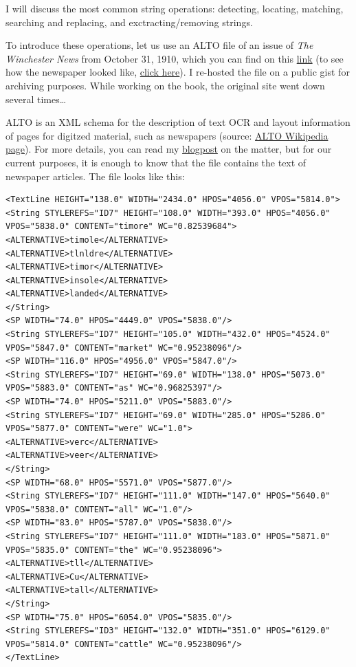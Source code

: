 \documentclass[
]{article}
\begin{document}
I will discuss the most common string operations: detecting, locating, matching, searching and
replacing, and exctracting/removing strings.

To introduce these operations, let us use an ALTO file of an issue of \emph{The Winchester News} from
October 31, 1910, which you can find on this
\href{https://gist.githubusercontent.com/b-rodrigues/5139560e7d0f2ecebe5da1df3629e015/raw/e3031d894ffb97217ddbad1ade1b307c9937d2c8/gistfile1.txt}{link} (to see
how the newspaper looked like,
\href{https://chroniclingamerica.loc.gov/lccn/sn86069133/1910-10-31/ed-1/seq-1/}{click here}). I re-hosted
the file on a public gist for archiving purposes. While working on the book, the original site went
down several times\ldots{}

ALTO is an XML schema for the description of text OCR and layout information of pages for digitzed
material, such as newspapers (source: \href{https://en.wikipedia.org/wiki/ALTO_(XML)}{ALTO Wikipedia page}).
For more details, you can read my
\href{https://www.brodrigues.co/blog/2019-01-13-newspapers_mets_alto/}{blogpost}
on the matter, but for our current purposes, it is enough to know that the file contains the text
of newspaper articles. The file looks like this:

\begin{verbatim}
<TextLine HEIGHT="138.0" WIDTH="2434.0" HPOS="4056.0" VPOS="5814.0">
<String STYLEREFS="ID7" HEIGHT="108.0" WIDTH="393.0" HPOS="4056.0" VPOS="5838.0" CONTENT="timore" WC="0.82539684">
<ALTERNATIVE>timole</ALTERNATIVE>
<ALTERNATIVE>tlnldre</ALTERNATIVE>
<ALTERNATIVE>timor</ALTERNATIVE>
<ALTERNATIVE>insole</ALTERNATIVE>
<ALTERNATIVE>landed</ALTERNATIVE>
</String>
<SP WIDTH="74.0" HPOS="4449.0" VPOS="5838.0"/>
<String STYLEREFS="ID7" HEIGHT="105.0" WIDTH="432.0" HPOS="4524.0" VPOS="5847.0" CONTENT="market" WC="0.95238096"/>
<SP WIDTH="116.0" HPOS="4956.0" VPOS="5847.0"/>
<String STYLEREFS="ID7" HEIGHT="69.0" WIDTH="138.0" HPOS="5073.0" VPOS="5883.0" CONTENT="as" WC="0.96825397"/>
<SP WIDTH="74.0" HPOS="5211.0" VPOS="5883.0"/>
<String STYLEREFS="ID7" HEIGHT="69.0" WIDTH="285.0" HPOS="5286.0" VPOS="5877.0" CONTENT="were" WC="1.0">
<ALTERNATIVE>verc</ALTERNATIVE>
<ALTERNATIVE>veer</ALTERNATIVE>
</String>
<SP WIDTH="68.0" HPOS="5571.0" VPOS="5877.0"/>
<String STYLEREFS="ID7" HEIGHT="111.0" WIDTH="147.0" HPOS="5640.0" VPOS="5838.0" CONTENT="all" WC="1.0"/>
<SP WIDTH="83.0" HPOS="5787.0" VPOS="5838.0"/>
<String STYLEREFS="ID7" HEIGHT="111.0" WIDTH="183.0" HPOS="5871.0" VPOS="5835.0" CONTENT="the" WC="0.95238096">
<ALTERNATIVE>tll</ALTERNATIVE>
<ALTERNATIVE>Cu</ALTERNATIVE>
<ALTERNATIVE>tall</ALTERNATIVE>
</String>
<SP WIDTH="75.0" HPOS="6054.0" VPOS="5835.0"/>
<String STYLEREFS="ID3" HEIGHT="132.0" WIDTH="351.0" HPOS="6129.0" VPOS="5814.0" CONTENT="cattle" WC="0.95238096"/>
</TextLine>
\end{verbatim}
\end{document}
